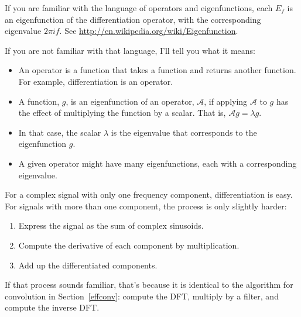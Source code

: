 \documentclass[12pt]{book}
\begin{document}
If you are familiar with the language of operators and eigenfunctions,
each $E_f$ is an eigenfunction of the differentiation operator, with the
corresponding eigenvalue $2 \pi i f$.  See
\url{http://en.wikipedia.org/wiki/Eigenfunction}.

If you are not familiar with that language, I'll tell you what it
means:

\newcommand{\op}{\mathcal{A}}

\begin{itemize}

\item An operator is a function that takes a function and returns
another function.  For example, differentiation is an operator.

\item A function, $g$, is an eigenfunction of an operator, $\op$, if
applying $\op$ to $g$ has the effect of multiplying the function by
a scalar.  That is, $\op g = \lambda g$.

\item In that case, the scalar $\lambda$ is the eigenvalue that
corresponds to the eigenfunction $g$.

\item A given operator might have many eigenfunctions, each with
a corresponding eigenvalue. 

\end{itemize}

For a complex signal with only one frequency component,
differentiation is easy.  For signals with more than one component,
the process is only slightly harder:

\begin{enumerate}

\item Express the signal as the sum of complex sinusoids.

\item Compute the derivative of each component by multiplication.

\item Add up the differentiated components.

\end{enumerate}

If that process sounds familiar, that's because it is identical
to the algorithm for convolution in Section~\ref{effconv}: compute
the DFT, multiply by a filter, and compute the inverse DFT.
\end{document}

